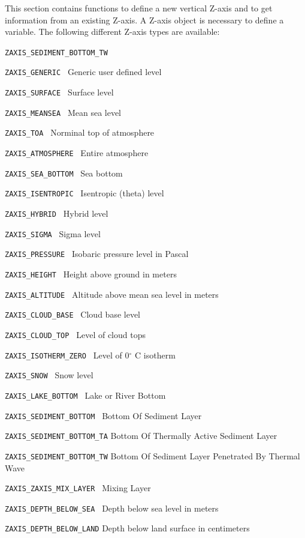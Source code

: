 This section contains functions to define a new vertical Z-axis
and to get information from an existing Z-axis.
A Z-axis object is necessary to define a variable.
The following different Z-axis types are available:

\vspace*{3mm}
\hspace*{8mm}\begin{minipage}{15cm}
\begin{deflist}{\large\texttt{ZAXIS\_SEDIMENT\_BOTTOM\_TW \ \ }}
\item[\large\texttt{ZAXIS\_GENERIC           }]  Generic user defined level
\item[\large\texttt{ZAXIS\_SURFACE           }]  Surface level
\item[\large\texttt{ZAXIS\_MEANSEA          }]  Mean sea level
\item[\large\texttt{ZAXIS\_TOA                  }]  Norminal top of atmosphere
\item[\large\texttt{ZAXIS\_ATMOSPHERE   }]  Entire atmosphere
\item[\large\texttt{ZAXIS\_SEA\_BOTTOM  }]  Sea bottom
\item[\large\texttt{ZAXIS\_ISENTROPIC      }]  Isentropic (theta) level
\item[\large\texttt{ZAXIS\_HYBRID            }]  Hybrid level
\item[\large\texttt{ZAXIS\_SIGMA              }]  Sigma level
\item[\large\texttt{ZAXIS\_PRESSURE          }]  Isobaric pressure level in Pascal
\item[\large\texttt{ZAXIS\_HEIGHT            }]  Height above ground in meters
\item[\large\texttt{ZAXIS\_ALTITUDE          }]  Altitude above mean sea level in meters
\item[\large\texttt{ZAXIS\_CLOUD\_BASE        }]  Cloud base level
\item[\large\texttt{ZAXIS\_CLOUD\_TOP         }]  Level of cloud tops
\item[\large\texttt{ZAXIS\_ISOTHERM\_ZERO    }]  Level of 0$^{\circ}$ C isotherm
\item[\large\texttt{ZAXIS\_SNOW                   }]  Snow level
\item[\large\texttt{ZAXIS\_LAKE\_BOTTOM               }]  Lake or River Bottom
\item[\large\texttt{ZAXIS\_SEDIMENT\_BOTTOM        }]  Bottom Of Sediment Layer
\item[\large\texttt{ZAXIS\_SEDIMENT\_BOTTOM\_TA}]  Bottom Of Thermally Active Sediment Layer
\item[\large\texttt{ZAXIS\_SEDIMENT\_BOTTOM\_TW}]  Bottom Of Sediment Layer Penetrated By Thermal Wave
\item[\large\texttt{ZAXIS\_ZAXIS\_MIX\_LAYER          }]  Mixing Layer
\item[\large\texttt{ZAXIS\_DEPTH\_BELOW\_SEA }]  Depth below sea level in meters
\item[\large\texttt{ZAXIS\_DEPTH\_BELOW\_LAND}]  Depth below land surface in centimeters
\end{deflist}
\end{minipage}

